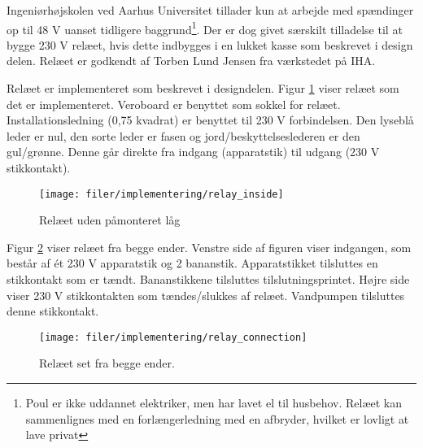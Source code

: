 Ingeniørhøjskolen ved Aarhus Universitet tillader kun at arbejde med spændinger op til 48 V uanset tidligere baggrund\footnote{Poul er ikke uddannet elektriker, men har lavet el til husbehov. Relæet kan sammenlignes med en forlængerledning med en afbryder, hvilket er lovligt at lave privat}. Der er dog givet særskilt tilladelse til at bygge 230 V relæet, hvis dette indbygges i en lukket kasse som beskrevet i design delen. Relæet er godkendt af Torben Lund Jensen fra værkstedet på IHA.

Relæet er implementeret som beskrevet i designdelen. Figur \ref{lab:Relay_inside} viser relæet som det er implementeret. Veroboard er benyttet som sokkel for relæet. Installationsledning (0,75 kvadrat) er benyttet til 230 V forbindelsen.
Den lyseblå leder er nul, den sorte leder er fasen  og jord/beskyttelseslederen er
den gul/grønne. Denne går direkte fra indgang (apparatstik) til udgang (230 V stikkontakt).
  


\begin{figure}[htb]
\centering
{\texttt{[image: filer/implementering/relay\_inside]}}
\caption{Relæet uden påmonteret låg}
\label{lab:Relay_inside}
\end{figure}

Figur \ref{lab:Relay_connection} viser relæet fra begge ender. Venstre side af figuren viser indgangen, som består af ét 230 V apparatstik og 2 bananstik. Apparatstikket tilsluttes en stikkontakt som er tændt. Bananstikkene tilsluttes tilslutningsprintet. Højre side viser 230 V stikkontakten som tændes/slukkes af relæet. Vandpumpen tilsluttes denne stikkontakt.

\begin{figure}[htb]
\centering
{\texttt{[image: filer/implementering/relay\_connection]}}
\caption{Relæet set fra begge ender.}
\label{lab:Relay_connection}
\end{figure}
